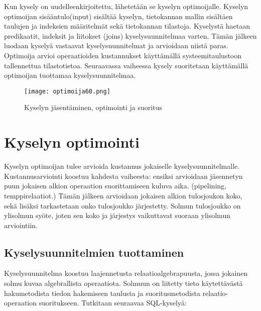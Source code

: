 \documentclass[finnish]{tktltiki2}
\theoremstyle{definition}
\theoremstyle{remark}
\begin{document}
Kun kysely on uudelleenkirjoitettu, lähetetään se kyselyn optimoijalle. Kyselyn optimoijan sisääntulo(input) sisältää kyselyn, tietokannan mallin sisältäen taulujen ja indeksien määritelmät sekä tietokannan tilastoja. Kyselystä haetaan predikaatit, indeksit ja liitokset (joins) kyselysuunnitelmaa varten. Tämän jälkeen luodaan kyselyä vastaavat kyselysuunnitelmat ja arvioidaan niistä paras. Optimoija arvioi operaatioiden kustannukset käyttämällä systeemitaulustoon tallennettua tilastotietoa. Seuraavassa vaiheessa kysely suoritetaan käyttämällä optimoijan tuottamaa kyselysuunnitelmaa.

\begin{figure}[!h]
  \caption{Kyselyn jäsentäminen, optimointi ja suoritus}
  \centering
    \texttt{[image: optimoija60.png]}
\end{figure}


\section{Kyselyn optimointi}
Kyselyn optimoijan tulee arvioida kustannus jokaiselle kyselysuunnitelmalle. Kustannusarviointi koostuu kahdesta vaiheesta: ensiksi arvioidaan jäsennetyn puun jokaisen alkion operaation suorittamiseen kuluva aika. (pipelining, temppirelaatiot.)
Tämän jälkeen arvioidaan jokaisen alkion tulosjoukon koko, sekä lisäksi tarkastetaan onko tulosjoukko järjestetty. Solmun tulosjoukko on ylisolmun syöte, joten sen koko ja järjestys vaikuttavat suoraan ylisolmun arviointiin.

\subsection{Kyselysuunnitelmien tuottaminen}
Kyselysuunnitelma koostuu laajennetusta relaatioalgebrapuusta, jossa jokainen solmu kuvaa algebrallista operaatiota. Solmuun on liitetty tieto käytettävästä hakumetodista tiedon hakemiseen taulusta ja suoritusmetodista relaatio-operaation suoritukseen. Tutkitaan seuraavaa SQL-kyselyä:
\end{document}
